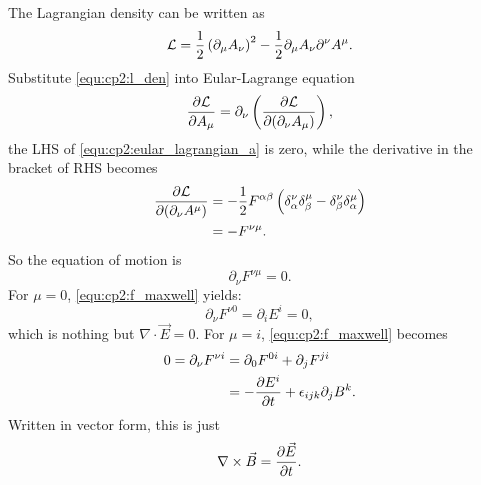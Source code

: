 \solution 
\begin{problembody}
    \item The Lagrangian density can be written as
    \begin{equation}\label{equ:cp2:l_den}
        \mathcal{L} = \frac{1}{2} \left(\partial_\mu A_\nu\right)^2 - \frac{1}{2}\partial_\mu A_\nu \partial^\nu A^\mu.
    \end{equation}
    Substitute \eqref{equ:cp2:l_den} into Eular-Lagrange equation
    \begin{equation}\label{equ:cp2:eular_lagrangian_a}
        \frac{\partial \mathcal{L}}{\partial A_\mu} = \partial_\nu \left(\frac{\partial \mathcal{L}}{\partial (\partial_\nu A_\mu)}\right),
    \end{equation}
    the LHS of \eqref{equ:cp2:eular_lagrangian_a} is zero, while the derivative in the bracket of RHS becomes
    \begin{align*}
        \frac{\partial \mathcal{L}}{\partial (\partial_\nu A^\mu)} 
        & = -\frac{1}{2} F^{\alpha\beta} \left(\delta^\nu_\alpha \delta^\mu_\beta - \delta^\nu_\beta \delta^\mu_\alpha\right)\\
        & = -F^{\nu\mu}.
    \end{align*}
    So the equation of motion is
    \begin{equation}\label{equ:cp2:f_maxwell}
        \partial_\nu F^{\nu\mu} = 0.
    \end{equation}
    For $\mu = 0$, \eqref{equ:cp2:f_maxwell} yields:
    \begin{equation*}
        \partial_\nu F^{\nu 0} = \partial_i E^i = 0,
    \end{equation*}
    which is nothing but $\nabla\cdot\vec{E} = 0$. For $\mu = i$, \eqref{equ:cp2:f_maxwell} becomes
    \begin{align*}
        0 = \partial_\nu F^{\nu i} 
        & = \partial_0 F^{0i} + \partial_j F^{ji}\\
        & = -\frac{\partial E^i}{\partial t} + \epsilon_{ijk}\partial_j B^k.
    \end{align*}
    Written in vector form, this is just
    \begin{equation*}
        \nabla\times\vec{B} = \frac{\partial \vec{E}}{\partial t}.
    \end{equation*}


\end{problembody}
